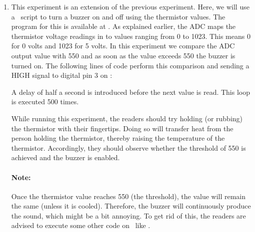 \begin{enumerate}
  \item This experiment is an extension of the previous
        experiment. Here, we will use a \scilab\ script to
        turn a buzzer on and off using the thermistor values.
        The program for this is available at
        .  As explained earlier,
        the ADC maps the thermistor voltage readings in to values
        ranging from 0 to 1023. This means 0 for 0 volts and 1023 for 5
        volts. In this experiment we compare the ADC output value with 550
        and as soon as the value exceeds 550 the buzzer is turned on. The following lines of code perform this
        comparison and sending a {HIGH} signal to digital pin 3 on \arduino:
        
        A delay of half a second is introduced
        before the next value is read. This loop is executed 500 times.

        While running this experiment,
        the readers should try holding (or rubbing) the thermistor with their fingertips.
        Doing so will transfer heat from the person holding the
        thermistor, thereby raising the temperature of the thermistor.
        Accordingly, they should observe whether the threshold of 550 is achieved
        and the buzzer is enabled.

        \paragraph{Note:} Once the thermistor value reaches 550 (the threshold), the value will remain the same
        (unless it is cooled). Therefore, the buzzer will continuously produce the sound, which might be
        a bit annoying. To get rid of this, the readers are advised to
        execute some other code on \arduino\ like .
\end{enumerate}


